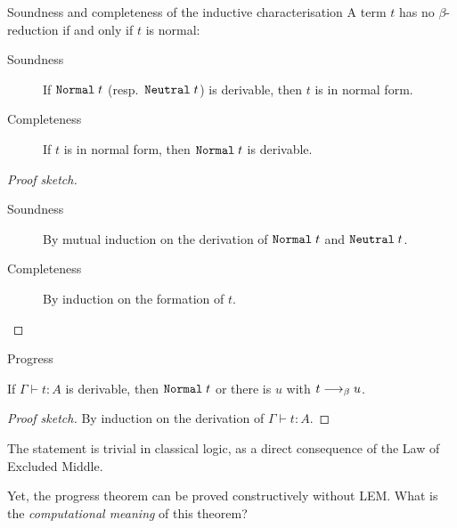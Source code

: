 \begin{frame}{Soundness and completeness of the inductive characterisation}
  A term $t$ has no $\beta$-reduction if and only if $t$ is normal:
  \begin{lemma}
    \begin{description}
      \item[Soundness] If $\mathtt{Normal}\;t$ (resp.\ $\mathtt{Neutral}\;t$) is derivable, then $t$ is in normal form.
      \item[Completeness]
        If $t$ is in normal form, then $\mathtt{Normal}\;t$ is derivable.
    \end{description}
  \end{lemma}
  \begin{proof}[Proof sketch]
    \begin{description}
      \item[Soundness] By mutual induction on the derivation of
    $\mathtt{Normal}\;t$ and $\mathtt{Neutral}\;t$.
      \item[Completeness] By induction on the formation of $t$.
    \end{description}
  \end{proof}

  
\end{frame}

\begin{frame}{Progress}
  \begin{theorem}
    If $\Gamma \vdash t : A$ is derivable, then $\mathtt{Normal}\;t$ or there is $u$ with $t \longrightarrow_{\beta} u$.
  \end{theorem}
  \begin{proof}[Proof sketch]
    By induction on the derivation of $\Gamma \vdash t : A$. 
  \end{proof}

  The statement is trivial in classical logic, as a direct consequence of the Law of Excluded Middle.

  Yet, the progress theorem can be proved constructively without LEM.
  What is the \emph{computational meaning} of this theorem?
\end{frame}


